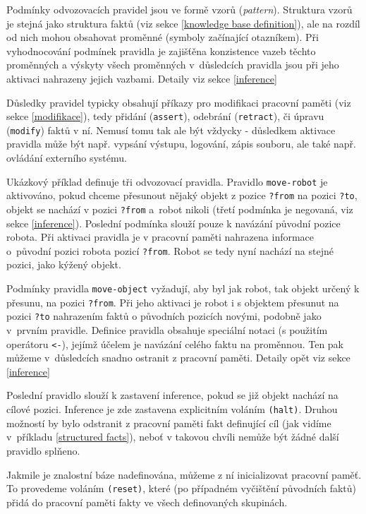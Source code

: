 Podmínky odvozovacích pravidel jsou ve formě vzorů (\emph{pattern}). Struktura
vzorů je stejná jako struktura faktů (viz sekce \ref{knowledge base
definition}), ale na rozdíl od nich mohou obsahovat proměnné (symboly začínající
otazníkem).  Při vyhodnocování podmínek pravidla je zajišťěna
konzistence vazeb těchto proměnných a výskyty všech proměnných v~důsledcích
pravidla jsou při jeho aktivaci nahrazeny jejich vazbami. Detaily viz sekce
\ref{inference}

Důsledky pravidel typicky obsahují příkazy pro modifikaci pracovní paměti (viz
sekce \ref{modifikace}), tedy přidání (\verb|assert|), odebrání
(\verb|retract|), či úpravu (\verb|modify|) faktů v ní. Nemusí tomu tak ale být
vždycky - důsledkem aktivace pravidla může být např. vypsání výstupu, logování,
zápis souboru, ale také např. ovládání externího systému.

Ukázkový příklad definuje tři odvozovací pravidla. Pravidlo
\verb|move-robot| je aktivováno, pokud chceme přesunout nějaký objekt z pozice
\verb|?from| na pozici \verb|?to|, objekt se nachází v pozici \verb|?from|
a~robot nikoli (třetí podmínka je negovaná, viz sekce \ref{inference}).
Poslední podmínka slouží pouze k navázání původní pozice robota.  Při aktivaci
pravidla je v pracovní paměti nahrazena informace o~původní pozici robota
pozicí \verb|?from|. Robot se tedy nyní nachází na stejné pozici, jako kýžený
objekt.

Podmínky pravidla \verb|move-object| vyžadují, aby byl jak robot, tak objekt
určený k přesunu, na pozici \verb|?from|. Při jeho aktivaci je robot i s objektem
přesunut na pozici \verb|?to| nahrazením faktů o původních pozicích novými,
podobně jako v~prvním pravidle. Definice pravidla obsahuje speciální notaci (s
použitím operátoru \verb|<-|), jejímž účelem je navázání celého faktu na
proměnnou. Ten pak můžeme v~důsledcích snadno ostranit z pracovní paměti.
Detaily opět viz sekce \ref{inference}

Poslední pravidlo slouží k zastavení inference, pokud se již objekt nachází na
cílové pozici. Inference je zde zastavena explicitním voláním \verb|(halt)|.
Druhou možností by bylo odstranit z pracovní paměti fakt definující cíl (jak
vidíme v~příkladu \ref{structured facts}), neboť v takovou chvíli nemůže být
žádné další pravidlo splňeno.

Jakmile je znalostní báze nadefinována, můžeme z ní inicializovat pracovní
paměť. To provedeme voláním \verb|(reset)|, které (po případném vyčištění
původních faktů) přidá do pracovní paměti fakty ve všech definovaných skupinách.

